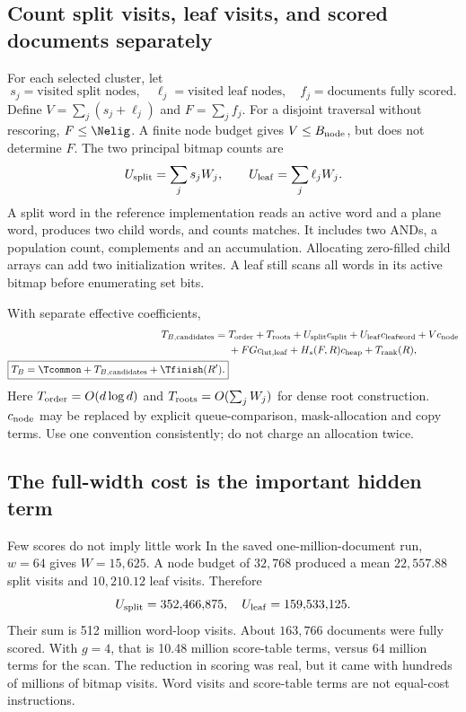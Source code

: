 \subsection{Count split visits, leaf visits, and scored documents separately}
For each selected cluster, let
\[
s_j=\text{visited split nodes},\quad
\ell_j=\text{visited leaf nodes},\quad
f_j=\text{documents fully scored}.
\]
Define $V=\sum_j(s_j+\ell_j)$ and $F=\sum_j f_j$. For a disjoint traversal without rescoring,
$F\leq\Nelig$. A finite node budget gives $V\leq B_{\rm node}$, but does not determine $F$.
The two principal bitmap counts are
\begin{equation}
U_{\rm split}=\sum_j s_j W_j,\qquad
U_{\rm leaf}=\sum_j \ell_j W_j.
\label{eq:bitmap-work}
\end{equation}
A split word in the reference implementation reads an active word and a plane word, produces
two child words, and counts matches. It includes two ANDs, a population count, complements and
an accumulation. Allocating zero-filled child arrays can add two initialization writes.
A leaf still scans all words in its active bitmap before enumerating set bits.

With separate effective coefficients,
\begin{align}
T_{B,\rm candidates}={}&T_{\rm order}+T_{\rm roots}
 +U_{\rm split}c_{\rm split}+U_{\rm leaf}c_{\rm leafword}
 +V c_{\rm node} \notag\\
 &+F G c_{\rm lut,leaf}+H_s(F,R)c_{\rm heap}+T_{\rm rank}(R),
\label{eq:branch-time}\\
\boxed{T_B=\Tcommon+T_{B,\rm candidates}+\Tfinish(R').}
\end{align}
Here $T_{\rm order}=O(d\log d)$ and $T_{\rm roots}=O(\sum_jW_j)$ for dense root construction.
$c_{\rm node}$ may be replaced by explicit queue-comparison, mask-allocation and copy terms.
Use one convention consistently; do not charge an allocation twice.

\subsection{The full-width cost is the important hidden term}
\begin{examplebox}{Few scores do not imply little work}
In the saved one-million-document run, $w=64$ gives $W=15{,}625$. A node budget of $32{,}768$
produced a mean $22{,}557.88$ split visits and $10{,}210.12$ leaf visits. Therefore
\[
U_{\rm split}=352{,}466{,}875,\quad U_{\rm leaf}=159{,}533{,}125.
\]
Their sum is 512 million word-loop visits. About $163{,}766$ documents were fully scored.
With $g=4$, that is 10.48 million score-table terms, versus 64 million terms for the scan.
The reduction in scoring was real, but it came with hundreds of millions of bitmap visits.
Word visits and score-table terms are not equal-cost instructions.
\end{examplebox}

